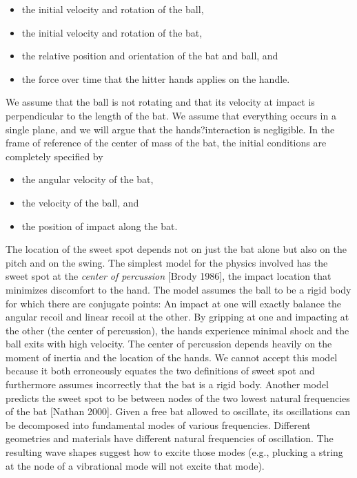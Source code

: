 \begin{itemize}
  \item the initial velocity and rotation of the ball,
\item the initial velocity and rotation of the bat,
\item the relative position and orientation of the bat and ball, and
\item the force over time that the hitter hands applies on the handle.
\end{itemize}
We assume that the ball is not rotating and that its velocity at impact is
perpendicular to the length of the bat. We assume that everything occurs
in a single plane, and we will argue that the hands?interaction is negligible.
In the frame of reference of the center of mass of the bat, the initial conditions
are completely specified by
\begin{itemize}
  \item the angular velocity of the bat,
\item the velocity of the ball, and
\item the position of impact along the bat.
\end{itemize}
The location of the sweet spot depends not on just the bat alone but also
on the pitch and on the swing.
The simplest model for the physics involved has the sweet spot at the
\emph{center of percussion} [Brody 1986], the impact location that minimizes discomfort
to the hand. The model assumes the ball to be a rigid body for which
there are conjugate points: An impact at one will exactly balance the angular
recoil and linear recoil at the other. By gripping at one and impacting at the
other (the center of percussion), the hands experience minimal shock and
the ball exits with high velocity. The center of percussion depends heavily
on the moment of inertia and the location of the hands. We cannot accept
this model because it both erroneously equates the two definitions of sweet
spot and furthermore assumes incorrectly that the bat is a rigid body.
Another model predicts the sweet spot to be between nodes of the two
lowest natural frequencies of the bat [Nathan 2000]. Given a free bat allowed
to oscillate, its oscillations can be decomposed into fundamental
modes of various frequencies. Different geometries and materials have different
natural frequencies of oscillation. The resulting wave shapes suggest
how to excite those modes (e.g., plucking a string at the node of a vibrational
mode will not excite that mode).




